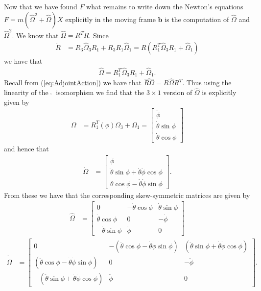 \documentclass[graybox,envcountchap,sectrefs]{svmonoMuga}
\begin{document}
Now that we have found $F$ what remains to write down the Newton's equations $F=m(\widehat{\Omega}^2+\dot{\widehat{\Omega}})X$ explicitly in the moving frame $\mathbf{b}$ is the computation of $\dot{\widehat{\Omega}}$ and ${\widehat{\Omega}}^2$. We know that
$\widehat{\Omega}=R^T\dot{R}$.
Since
\begin{align*}
\dot{R}&=R_3\widehat{\Omega}_3R_1+R_3R_1\widehat{\Omega}_1=R(R_1^T\widehat{\Omega}_3R_1+\widehat{\Omega}_1)
\end{align*}
we have that
\begin{align*}
\widehat{\Omega}=R_1^T\widehat{\Omega}_3R_1+\widehat{\Omega}_1.
\end{align*}
Recall from (\ref{eq:AdjointAction}) we have that $\widehat{R\Omega}=R\widehat{\Omega}R^T$. Thus using the linearity of the $\:\widehat{}\:$ isomorphism we find that the $3\times 1$ version of $\widehat{\Omega}$ is explicitly given by
\begin{align*}
\Omega &= R_1^T(\phi)\Omega_3+\Omega_1=
\begin{bmatrix}
\dot{\phi} \\ \dot{\theta}\sin\phi \\ \dot{\theta}\cos\phi
\end{bmatrix}
\end{align*}
and hence that
\begin{align*}
\dot{\Omega} &= 
\begin{bmatrix}
\ddot{\phi} \\ \ddot{\theta}\sin\phi+\dot{\theta}\dot{\phi}\cos\phi \\ \ddot{\theta}\cos\phi-\dot{\theta}\dot{\phi}\sin\phi
\end{bmatrix}.
\end{align*}
From these we have that the corresponding skew-symmetric matrices are given by
\begin{align*}
\widehat{\Omega} &= 
\begin{bmatrix}
0 & -\dot{\theta}\cos\phi & \dot{\theta}\sin\phi \\ 
\dot{\theta}\cos\phi &0 &-\dot{\phi} \\
-\dot{\theta}\sin\phi &\dot{\phi} &0
\end{bmatrix}
\end{align*}
\begin{align*}
\dot{\widehat{\Omega}} &= 
\begin{bmatrix}
0 & -(\ddot{\theta}\cos\phi-\dot{\theta}\dot{\phi}\sin\phi) & (\ddot{\theta}\sin\phi+\dot{\theta}\dot{\phi}\cos\phi) \\ 
(\ddot{\theta}\cos\phi-\dot{\theta}\dot{\phi}\sin\phi) &0 &-\ddot{\phi} \\
-(\ddot{\theta}\sin\phi+\dot{\theta}\dot{\phi}\cos\phi) &\ddot{\phi} &0
\end{bmatrix}.
\end{align*}
\end{document}
